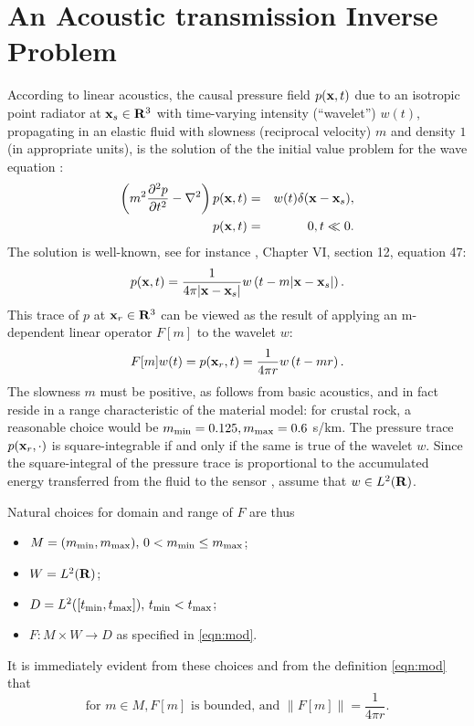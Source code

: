 \section{An Acoustic transmission Inverse Problem}
According to linear acoustics, the causal pressure field $p({\bf x},t)$ due to an
isotropic point radiator at ${\bf x}_s \in {\bf R}^3$ with time-varying
intensity (``wavelet'') $w(t)$, propagating in an elastic fluid with
slowness (reciprocal velocity) $m$ and density $1$ (in appropriate
units), is the solution of the the initial value problem for the wave equation \cite[]{Frie:58}:
\begin{eqnarray}
  \label{eqn:awe}
  \left(m^2\frac{\partial^2 p}{\partial t^2} - \nabla^2\right) p({\bf x},t) &=&
                                                                         w(t)\delta({\bf x}-{\bf x}_s), \nonumber\\
  p({\bf x},t)&=&0, t\ll 0.
\end{eqnarray}
The solution is well-known, see for instance
\cite{CourHil:62}, Chapter VI, section 12, equation 47:
\begin{equation}
  \label{eqn:homsol}
  p({\bf x},t) = \frac{1}{4\pi |{\bf x}-{\bf x}_s|}w\left(t-m|{\bf x}-{\bf x}_s|\right).
\end{equation}
This trace of $p$ at ${\bf x}_r \in {\bf R}^3$ can be viewed as the result of
applying an m-dependent linear operator $F[m]$ to the wavelet $w$:
\begin{equation}
\label{eqn:mod}
F[m]w(t)  = p({\bf x}_r,t) = \frac{1}{4\pi r}w\left(t-mr\right).
\end{equation}
The slowness $m$ must be positive, as follows from basic acoustics,
and in fact reside in a range characteristic of the
material model: for crustal rock, a reasonable choice would be
$m_{\rm min}=0.125, m_{\rm max}=0.6$ s/km. The pressure trace
$p({\bf x}_r,\cdot)$ is square-integrable if and only if the same is true
of the wavelet $w$. Since the square-integral of the pressure trace is
proportional to the accumulated energy transferred from the fluid to
the sensor \cite[]{SantosaSymes:00}, assume that $w \in L^2({\bf R})$.

Natural choices for domain and
range of $F$ are thus
\begin{itemize}
\item $M=(m_{\rm min}, m_{\rm max}),\,0 < m_{\rm min} \le m_{\rm
    max}$;
\item $W = L^2({\bf R})$;
\item $D=L^2([t_{\rm min},t_{\rm max}]),\, t_{\rm min}<t_{\rm max}$;
\item $F: M \times W \rightarrow D$ as specified in \ref{eqn:mod}.
\end{itemize}
It is immediately evident from these choices and from the definition
\ref{eqn:mod} that
\begin{equation}
  \label{eqn:mapprop}
  \mbox{for }m \in M, F[m] \mbox{ is bounded, and }\|F[m]\| =
  \frac{1}{4\pi r}.
\end{equation}

